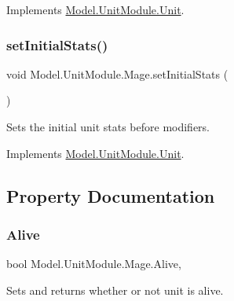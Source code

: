 Implements \hyperlink{interface_model_1_1_unit_module_1_1_unit_ad48776b3bd231bf80d2eec87b7498302}{Model.\+Unit\+Module.\+Unit}.

\hypertarget{class_model_1_1_unit_module_1_1_mage_a7b16a0324edbd7daa0d54ba5b6bd9735}{}\label{class_model_1_1_unit_module_1_1_mage_a7b16a0324edbd7daa0d54ba5b6bd9735} 
\subsubsection{\texorpdfstring{set\+Initial\+Stats()}{setInitialStats()}}
{\footnotesize\ttfamily void Model.\+Unit\+Module.\+Mage.\+set\+Initial\+Stats (\begin{DoxyParamCaption}{ }\end{DoxyParamCaption})\hspace{0.3cm}{\ttfamily [inline]}}

Sets the initial unit stats before modifiers. 

Implements \hyperlink{interface_model_1_1_unit_module_1_1_unit_a3b67c1b9e929a9f7d4191de20996220a}{Model.\+Unit\+Module.\+Unit}.



\subsection{Property Documentation}
\hypertarget{class_model_1_1_unit_module_1_1_mage_aedac42cbab6a6e18fef3237f9996552b}{}\label{class_model_1_1_unit_module_1_1_mage_aedac42cbab6a6e18fef3237f9996552b} 
\subsubsection{\texorpdfstring{Alive}{Alive}}
{\footnotesize\ttfamily bool Model.\+Unit\+Module.\+Mage.\+Alive\hspace{0.3cm}{\ttfamily [get]}, {\ttfamily [set]}}

Sets and returns whether or not unit is alive. \hypertarget{class_model_1_1_unit_module_1_1_mage_a5d6361a991dc1726f5de85d2e2e31afd}{}\label{class_model_1_1_unit_module_1_1_mage_a5d6361a991dc1726f5de85d2e2e31afd} 
